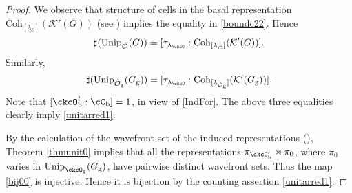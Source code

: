 \documentclass[12pt,a4paper]{amsart}
\newcommand{\CK}{{\mathcal {K}}}
\newcommand{\CO}{{\mathcal {O}}}
\numberwithin{equation}{section}
\theoremstyle{remark}
\def\Unip{\mathrm{Unip}}
\def\lamck{\lambda_\ckcO}
\def\Coh{\mathrm{Coh}}
\def\ckcOpb{\ckcO'_{\mathrm b}}
\def\Gg{G_{\mathrm g}}
\begin{document}
\begin{proof}
  We observe that structure of cells in the basal representation
  $\Coh_{[\lambda_{\check \CO}]}(\CK'(G))$ (see \cite[Theorem 5]{Bo}) implies
  the equality in \eqref{boundc22}. Hence
  \[
    \sharp(\Unip_{\check \CO}(G)) =[\tau_{\lamck}: \Coh_{[\lambda_{\check \CO}]}(\CK'(G))].
  \]
  Similarly,
  \[
    \sharp(\Unip_{\check \CO_\mathrm g}(G_\mathrm g)) = [\tau_{\lamck}: \Coh_{[\lambda_{\check \CO_\mathrm g}]}(\CK'(G_\mathrm g))].
  \]
  Note that $[\ckcO_{\mathrm b}^{t}:\cC_{\mathrm b}]=1$, in view of
  \eqref{IndFor}. The above three equalities clearly imply \eqref{unitarred1}.

 By the  calculation of  the wavefront set of the induced representations (\cite[Corollary 5.0.10]{B.Orbit}),  Theorem \ref{thmunit0} implies that all the representations $\pi_{\ckcOpb}\rtimes \pi_{0}$, where $\pi_0$ varies in $\Unip_{\ckcO_{\mathrm g}}(\Gg)$, have pairwise distinct wavefront sets.   Thus the map \eqref{bij00} is injective. Hence it is bijection by the counting assertion \eqref{unitarred1}.
\end{proof}

\end{document}
